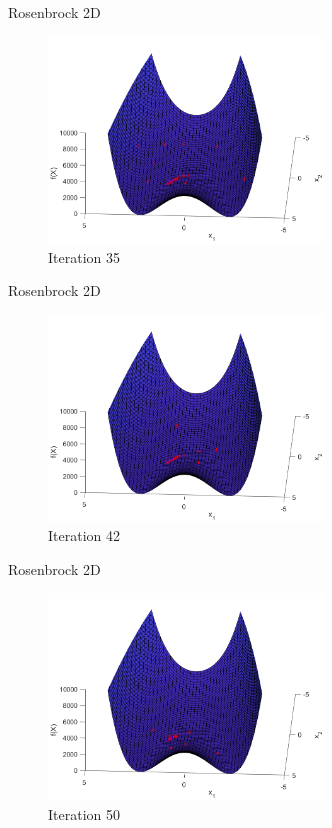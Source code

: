 \documentclass[xcolor=table]{beamer}
\begin{document}
\begin{frame}{Rosenbrock 2D}
  \begin{figure}[h]
  \begin{center}
    \includegraphics[width=0.65\textwidth]{img/smpl/rosn2d-1-100/loa-iter-35}
    \caption{Iteration 35}
  \end{center}
  \end{figure}
\end{frame}
\begin{frame}{Rosenbrock 2D}
  \begin{figure}[h]
  \begin{center}
    \includegraphics[width=0.65\textwidth]{img/smpl/rosn2d-1-100/loa-iter-42}
    \caption{Iteration 42}
  \end{center}
  \end{figure}
\end{frame}
\begin{frame}{Rosenbrock 2D}
  \begin{figure}[h]
  \begin{center}
    \includegraphics[width=0.65\textwidth]{img/smpl/rosn2d-1-100/loa-iter-50}
    \caption{Iteration 50}
  \end{center}
  \end{figure}
\end{frame}
\end{document}

